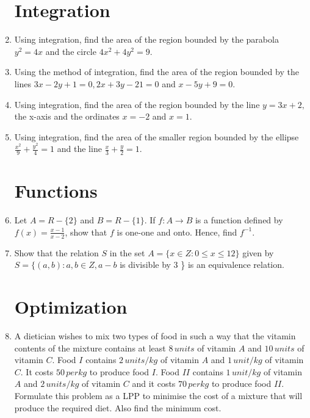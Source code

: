 \documentclass[10pt,-letter paper]{article}
\providecommand{\brak}[1]{\ensuremath{\left(#1\right)}}
\begin{document}
\begin{enumerate}
\section{Integration}
\item Using integration, find the area of the region bounded by the parabola $y^{2}=4x$ and the circle $4x^{2}+4y^{2}=9$.

\item Using the method of integration, find the area of the region bounded by the lines $3x - 2y + 1 = 0, 2x + 3y - 21 = 0$ and $x - 5y + 9 = 0$.


\item Using integration, find the area of the region bounded by the line
$y = 3x + 2,$ the x-axis and the ordinates $x = - 2$ and $x = 1$.

\item Using integration, find the area of the smaller region bounded by the ellipse $\frac{x^{2}}{9}+\frac{y^{2}}{4}=1$ and the line $\frac{x}{3}+\frac{y}{2}=1$.

\section{Functions}
\item Let $A= R - \{2\}$ and $B = R - \{1\}$. If $f : A \rightarrow B$ is a function defined by $f\brak{x}=\frac{x-1}{x-2}$, show that $f$ is one-one and onto. Hence, find $f^{-1}$.

\item Show that the relation $S$ in the set $A = \{x \in Z : 0  \le x  \le 12\}$ given by $S= \{\brak{a, b} : a, b \in Z, a-b $ is divisible by $ 3 $ \} is an equivalence relation.

\section{Optimization}

\item A dietician wishes to mix two types of food in such a way that the vitamin contents of the mixture contains at least $8 \hspace{2pt}units$ of vitamin $A$ and $10\hspace{2pt}units$ of vitamin $C $. Food $I $ contains $2\hspace{2pt} units/kg$ of vitamin $A$ and $1\hspace{2pt} unit/kg$ of vitamin $C$. It costs \rupee$50 \hspace{2pt}per kg$ to produce food $I$. Food $II$ contains $1 \hspace{2pt}unit/kg$ of vitamin $A$ and $2\hspace{2pt} units/kg$ of vitamin $C$ and it costs \rupee $70\hspace{2pt} per kg$ to produce food $II$. Formulate this problem as a LPP to minimise the cost of a mixture that will produce the required diet. Also find the minimum cost.



\end{enumerate}
\end{document}
